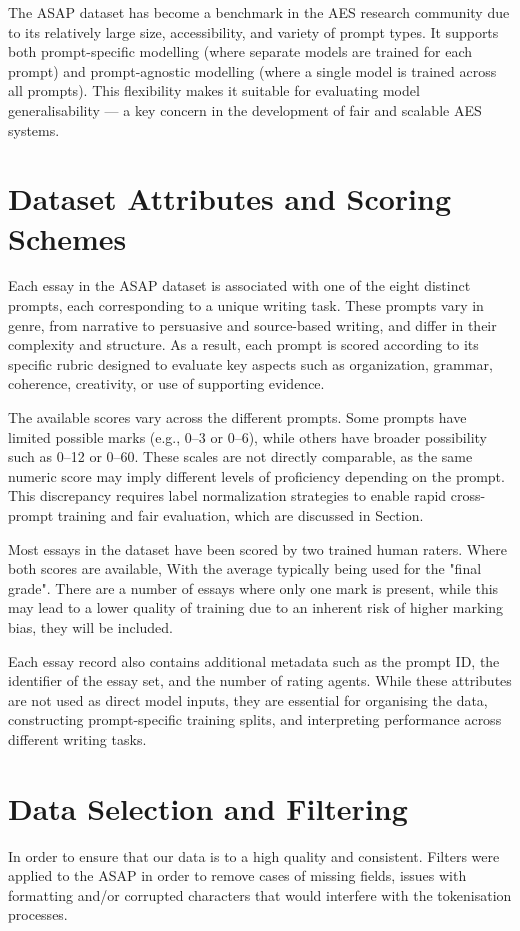 \documentclass[10pt]{report}
\begin{document}
The ASAP dataset has become a benchmark in the AES research community due to its relatively large size, accessibility, and variety of prompt types. It supports both prompt-specific modelling (where separate models are trained for each prompt) and prompt-agnostic 
modelling (where a single model is trained across all prompts). This flexibility makes it suitable for evaluating model generalisability — a key concern in the development of fair and scalable AES systems.

\section{Dataset Attributes and Scoring Schemes}
Each essay in the ASAP dataset is associated with one of the eight distinct prompts, each corresponding to a unique writing task. These prompts vary in genre, from narrative to persuasive and source-based writing, and differ in their complexity and structure. As a result, each prompt is scored according to its specific rubric designed to evaluate key aspects such as organization, grammar, coherence, creativity, or use of supporting evidence.

The available scores vary across the different prompts. Some prompts have limited possible marks (e.g., 0--3 or 0--6), while others have broader possibility such as 0--12 or 0--60. These scales are not directly comparable, as the same numeric score may imply different levels of proficiency depending on the prompt. This discrepancy requires label normalization strategies to enable rapid cross-prompt training and fair evaluation, which are discussed in Section.

Most essays in the dataset have been scored by two trained human raters. Where both scores are available, With the average typically being used for the "final grade". There are a number of essays where only one mark is present, while this may lead to a lower quality of training due to an inherent risk of higher marking bias, they will be included.

Each essay record also contains additional metadata such as the prompt ID, the identifier of the essay set, and the number of rating agents. While these attributes are not used as direct model inputs, they are essential for organising the data, constructing prompt-specific training splits, and interpreting performance across different writing tasks.

\section{Data Selection and Filtering}
In order to ensure that our data is to a high quality and consistent. Filters were applied to the ASAP in order to remove cases of missing fields, issues with formatting and/or corrupted characters that would interfere with the tokenisation processes.
\end{document}
